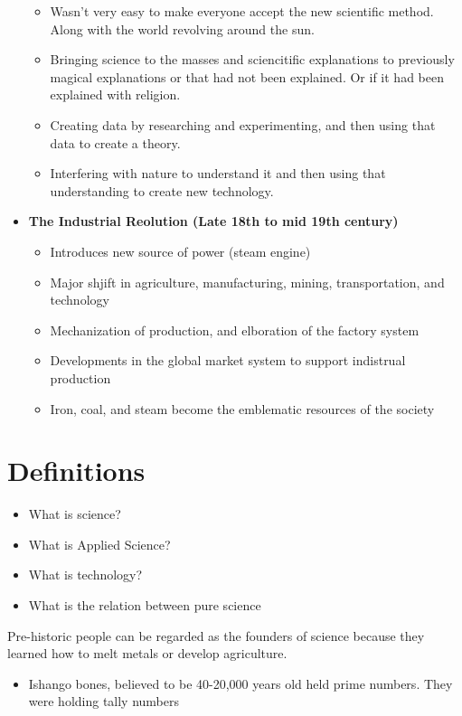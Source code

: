 \documentclass{article}
\begin{document}
\begin{itemize}
\begin{itemize}
\begin{itemize}
        \end{itemize}
      \item Wasn't very easy to make everyone accept
        the new scientific method. Along with the
        world revolving around the sun.
      \item Bringing science to the masses
        and sciencitific explanations to previously
        magical explanations or that had not been explained.
        Or if it had been explained with religion.
      \item Creating data by researching
        and experimenting, and then using that data
        to create a theory.
      \item Interfering with nature to understand it
        and then using that understanding to create
        new technology.
    \end{itemize}
  \item \textbf{The Industrial Reolution (Late 18th to mid 19th century)}
    \begin{itemize}
      \item Introduces new source of power (steam engine)
      \item Major shjift in agriculture, manufacturing,
        mining, transportation, and technology
      \item Mechanization of production, and elboration of the factory system
      \item Developments in the global market system to support indistrual production
      \item Iron, coal, and steam become the emblematic resources of the society
    \end{itemize}
\end{itemize}

\section*{Definitions}
\begin{itemize}
  \item What is science?
  \item What is Applied Science?
  \item What is technology?
  \item What is the relation between pure science
\end{itemize}


Pre-historic people can be regarded as the founders
of science because they learned how to melt metals or develop agriculture.
\begin{itemize}
  \item Ishango bones, believed to be 40-20,000 years old held prime numbers.
   They were holding tally numbers
\end{itemize}
\end{document}
